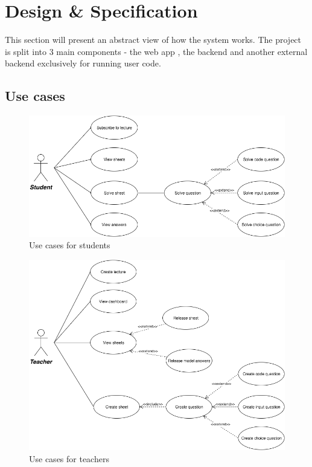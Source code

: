 \chapter{Design \& Specification}

This section will present an abstract view of how the system works.
The project is split into 3 main components - the web app , the backend and another external backend exclusively for running user code.

\section{Use cases}
\begin{figure}[H]
  \centering

	\includegraphics[width=\textwidth,height=\textheight,keepaspectratio]{cases}
	\caption{Use cases for students}
\end{figure}

\begin{figure}[H]
  \centering

	\includegraphics[width=\textwidth,height=\textheight,keepaspectratio]{cases2}
	\caption{Use cases for teachers}
\end{figure}

